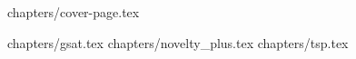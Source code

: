 \documentclass[a4paper,12pt]{article}
\begin{document}


{chapters/cover-page.tex}

\tableofcontents
\clearpage

{chapters/gsat.tex}
{chapters/novelty_plus.tex}
{chapters/tsp.tex}
\end{document}
